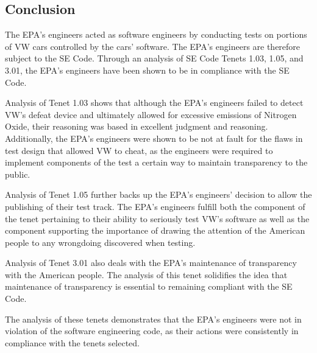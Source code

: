 \subsection{Conclusion}
The EPA's engineers acted as software engineers by conducting tests on portions of VW cars controlled by the cars' software\cite{se_code, epa_track}. The EPA's engineers are therefore subject to the SE Code. Through an analysis of SE Code Tenets 1.03, 1.05, and 3.01, the EPA's engineers have been shown to be in compliance with the SE Code.

Analysis of Tenet 1.03 shows that although the EPA's engineers failed to detect VW's defeat device\cite{study} and ultimately allowed for excessive emissions of Nitrogen Oxide\cite{emissions_standards}, their reasoning was based in excellent judgment and reasoning\cite{anab_accreditation}. Additionally, the EPA's engineers were shown to be not at fault for the flaws in test design that allowed VW to cheat, as the engineers were required to implement components of the test a certain way to maintain transparency to the public\cite{emissions_standards}.

Analysis of Tenet 1.05 further backs up the EPA's engineers' decision to allow the publishing of their test track. The EPA's engineers fulfill both the component of the tenet pertaining to their ability to seriously test VW's software\cite{anab_accreditation} as well as the component supporting the importance of drawing the attention of the American people to any wrongdoing discovered when testing\cite{epa_ghg_report}.

Analysis of Tenet 3.01 also deals with the EPA's maintenance of transparency with the American people. The analysis of this tenet solidifies the idea that maintenance of transparency is essential to remaining compliant with the SE Code\cite{epa_track_details}.

The analysis of these tenets demonstrates that the EPA's engineers were not in violation of the software engineering code, as their actions were consistently in compliance with the tenets selected.